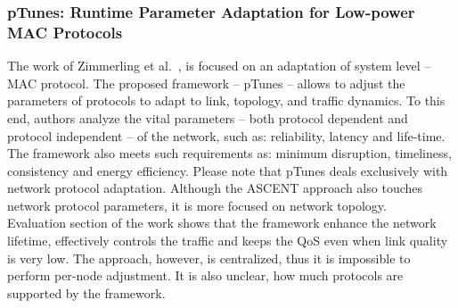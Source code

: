 \subsubsection*{pTunes: Runtime Parameter Adaptation for Low-power MAC Protocols}


The work of Zimmerling et al.~\cite{zimmerling12}, is focused on an adaptation of system level -- MAC
protocol. The proposed framework -- pTunes -- allows to adjust the parameters
of protocols to adapt to link, topology, and traffic dynamics. To this end, authors
analyze the vital parameters -- both protocol dependent and protocol independent
-- of the network, such as: reliability, latency and life-time. The framework also
meets such requirements as: minimum disruption, timeliness, consistency and
energy efficiency.
Please note that pTunes deals exclusively with network protocol adaptation.
Although the ASCENT\cite{ascent} approach also touches network protocol
parameters, it is more focused on network topology.
\\
Evaluation section of the work shows that the framework enhance the network
lifetime, effectively controls the traffic and keeps the QoS even when link
quality is very low. The approach, however, is centralized, thus it is
impossible to perform per-node adjustment. It is also unclear, how much
protocols are supported by the framework.
